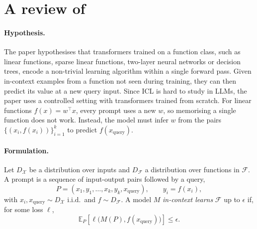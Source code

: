 \vspace{-0.5em}
 \section{A review of \citet{garg2022what}}

\vspace{-0.5em}
  \paragraph{Hypothesis.} The paper hypothesises that transformers trained on a function
  class, such as linear functions, sparse linear functions, two-layer neural networks or
  decision trees, encode a non-trivial learning algorithm within a single forward pass.
  Given in-context examples from a function not seen during training, they can then
  predict its value at a new query input. Since ICL is hard to study in LLMs, the paper
  uses a controlled setting with transformers trained from scratch. For linear functions
  $f(x)=w^\top x$, every prompt uses a new $w$, so memorising a single function does not
  work. Instead, the model must infer $w$ from the pairs $\{(x_i, f(x_i))\}_{i=1}^k$ to
  predict $f(x_{\text{query}})$.

\vspace{-0.5em}
  \paragraph{Formulation.} Let $D_\mathcal{X}$ be a distribution over inputs and
  $D_\mathcal{F}$ a distribution over functions in $\mathcal{F}$. A prompt is a sequence
  of input-output pairs followed by a query,
  \begin{equation}
    P = (x_1, y_1, \dots, x_k, y_k, x_{\text{query}}), \qquad y_i = f(x_i),
    \label{prompt}
  \end{equation}
  with $x_i, x_{\text{query}} \sim D_\mathcal{X}$ i.i.d.\ and $f \sim D_\mathcal{F}$.
  A model $M$ \emph{in-context learns} $\mathcal{F}$ up to $\epsilon$ if, for some loss
  $\ell$,
  \begin{equation}
    \mathbb{E}_P\!\left[\ell\big(M(P), f(x_{\text{query}})\big)\right] \le \epsilon.
  \end{equation}

\vspace{-0.5em}
